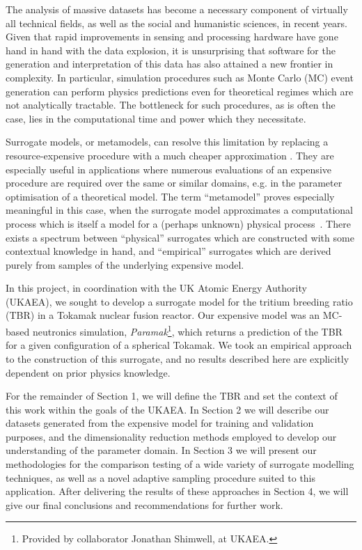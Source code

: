 The analysis of massive datasets has become a necessary component of virtually all technical fields, as well as the social and humanistic sciences, in recent years. Given that rapid improvements in sensing and processing hardware have gone hand in hand with the data explosion, it is unsurprising that software for the generation and interpretation of this data has also attained a new frontier in complexity. In particular, simulation procedures such as Monte Carlo (MC) event generation can perform physics predictions even for theoretical regimes which are not analytically tractable. The bottleneck for such procedures, as is often the case, lies in the computational time and power which they necessitate.

Surrogate models, or metamodels, can resolve this limitation by replacing a
resource-expensive procedure with a much cheaper approximation
\cite{Sondergaard2003}. They are especially useful in applications where
numerous evaluations of an expensive procedure are required over the same or
similar domains, e.g. in the parameter optimisation of a theoretical model. The
term ``metamodel'' proves especially meaningful in this case, when the surrogate
model approximates a computational process which is itself a model for a
(perhaps unknown) physical process~\cite{Myers2002}. There exists a spectrum
between ``physical'' surrogates which are constructed with some contextual
knowledge in hand, and ``empirical'' surrogates which are derived purely from
samples of the underlying expensive model.

In this project, in coordination with the UK Atomic Energy Authority (UKAEA), we sought to develop a surrogate model for the tritium breeding ratio (TBR) in a Tokamak nuclear fusion reactor. Our expensive model was an MC-based neutronics simulation, \textit{Paramak}\footnote{Provided by collaborator Jonathan Shimwell, at UKAEA.}, which returns a prediction of the TBR for a given configuration of a spherical Tokamak. We took an empirical approach to the construction of this surrogate, and no results described here are explicitly dependent on prior physics knowledge.

For the remainder of Section 1, we will define the TBR and set the context of this work within the goals of the UKAEA. In Section 2 we will describe our datasets generated from the expensive model for training and validation purposes, and the dimensionality reduction methods employed to develop our understanding of the parameter domain. In Section 3 we will present our methodologies for the comparison testing of a wide variety of surrogate modelling techniques, as well as a novel adaptive sampling procedure suited to this application. After delivering the results of these approaches in Section 4, we will give our final conclusions and recommendations for further work.

